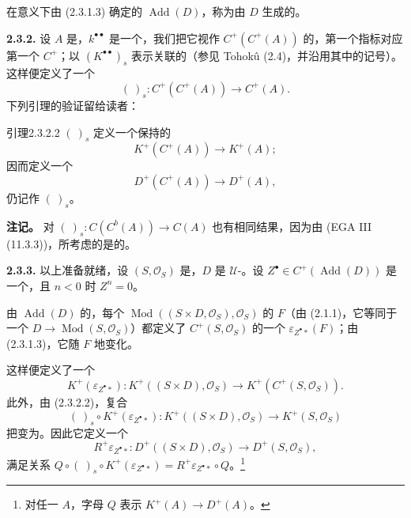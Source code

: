 在意义下由 (2.3.1.3) 确定的 $\operatorname{Add}(D)$，称为由 $D$ 生成的。

\textbf{2.3.2.} 设 $A$ 是，$k^{\bullet\bullet}$ 是一个，我们把它视作 $C^+(C^+(A))$ 的，第一个指标对应第一个 $C^+$；以 $(K^{\bullet\bullet})_s$ 表示关联的（参见 Tohokû (2.4)，并沿用其中的记号）。这样便定义了一个
\[
(\ )_s:C^+(C^+(A))\longrightarrow C^+(A). \tag{2.3.2.1}
\]
下列引理的验证留给读者：
\begin{SGAresult}{引理}{2.3.2.2}
 $(\ )_s$ 定义一个保持的
\[
K^+(C^+(A))\longrightarrow K^+(A);
\]
因而定义一个
\[
D^+(C^+(A))\longrightarrow D^+(A),
\]
仍记作 $(\ )_s$。
\end{SGAresult}
\textbf{注记。} 对 $(\ )_s:C(C^b(A))\to C(A)$ 也有相同结果，因为由 (EGA III (11.3.3))，所考虑的是的。

\textbf{2.3.3.} 以上准备就绪，设 $(S,\mathcal O_S)$ 是，$D$ 是 $\mathcal U$-。设 $Z^\bullet\in C^+(\operatorname{Add}(D))$ 是一个，且 $n<0$ 时 $Z^n=0$。

由 $\operatorname{Add}(D)$ 的，每个 $\operatorname{Mod}((S\times D,\mathcal O_S),\mathcal O_S)$ 的 $F$（由 (2.1.1)，它等同于一个 $D\to\operatorname{Mod}(S,\mathcal O_S)$）都定义了 $C^+(S,\mathcal O_S)$ 的一个 $\varepsilon_{Z^\bullet*}(F)$；由 (2.3.1.3)，它随 $F$ 地变化。

这样便定义了一个
\[
K^+(\varepsilon_{Z^\bullet*}):K^+((S\times D),\mathcal O_S)
\longrightarrow K^+(C^+(S,\mathcal O_S)). \tag{2.3.3.1}
\]
此外，由 (2.3.2.2)，复合
\[
(\ )_s\circ K^+(\varepsilon_{Z^\bullet*}):K^+((S\times D),\mathcal O_S)
\longrightarrow K^+(S,\mathcal O_S)
\]
把变为。因此它定义一个
\[
R^+\varepsilon_{Z^\bullet*}:D^+((S\times D),\mathcal O_S)
\longrightarrow D^+(S,\mathcal O_S), \tag{2.3.3.2}
\]
满足关系 $Q\circ(\ )_s\circ K^+(\varepsilon_{Z^\bullet*})=R^+\varepsilon_{Z^\bullet*}\circ Q$。\footnote{对任一 $A$，字母 $Q$ 表示 $K^+(A)\to D^+(A)$。}

